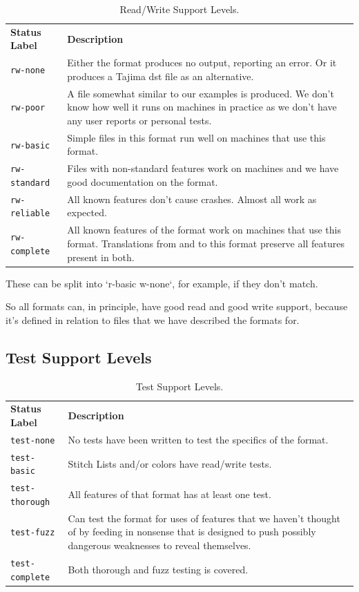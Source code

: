 \documentclass[a4paper]{report}
\begin{document}
\begin{longtable}{p{4cm} p{8cm}}
\caption{Read/Write Support Levels.}
\label{tab:read-write-support} \\
\textbf{Status Label} &
\textbf{Description} \\

\texttt{rw-none} &
Either the format produces no output, reporting an error. Or it produces a
Tajima dst file as an alternative. \\

\texttt{rw-poor} &
A file somewhat similar to our examples is produced. We don't know how well
it runs on machines in practice as we don't have any user reports or personal
tests. \\

\texttt{rw-basic} &
Simple files in this format run well on machines that use this format. \\

\texttt{rw-standard} &
Files with non-standard features work on machines and we have good documentation
on the format. \\

\texttt{rw-reliable} &
All known features don't cause crashes. Almost all work as expected. \\

\texttt{rw-complete} &
All known features of the format work on machines that use this format.
Translations from and to this format preserve all features present in both.
\end{longtable}

These can be split into `r-basic w-none`, for example, if they don't match.

So all formats can, in principle, have good read and good write support, because it's defined in relation to files that we have described the formats for.

\subsection{Test Support Levels}

\begin{longtable}{p{4cm} p{8cm}}
\caption{Test Support Levels.}
\label{tab:test-support} \\
\textbf{Status Label} &
\textbf{Description} \\

\texttt{test-none} &
No tests have been written to test the specifics of the format. \\

\texttt{test-basic} &
Stitch Lists and/or colors have read/write tests. \\

\texttt{test-thorough} &
All features of that format has at least one test. \\

\texttt{test-fuzz} &
Can test the format for uses of features that we haven't thought of by feeding
in nonsense that is designed to push possibly dangerous weaknesses to reveal
themselves. \\

\texttt{test-complete} &
Both thorough and fuzz testing is covered.
\end{longtable}
\end{document}
